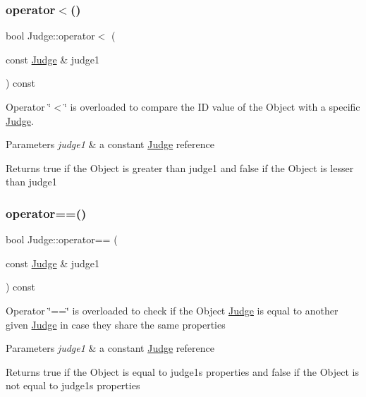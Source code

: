 \subsubsection{\texorpdfstring{operator$<$()}{operator<()}}
{\footnotesize\ttfamily bool Judge\+::operator$<$ (\begin{DoxyParamCaption}\item[{const \hyperlink{class_judge}{Judge} \&}]{judge1 }\end{DoxyParamCaption}) const}



Operator \char`\"{}$<$\char`\"{} is overloaded to compare the ID value of the Object with a specific \hyperlink{class_judge}{Judge}. 


\begin{DoxyParams}{Parameters}
{\em judge1} & a constant \hyperlink{class_judge}{Judge} reference \\
\hline
\end{DoxyParams}
\begin{DoxyReturn}{Returns}
true if the Object is greater than judge1 and false if the Object is lesser than judge1 
\end{DoxyReturn}
\mbox{\label{class_judge_ab3a06af6dc3a2f5f427c146e2b1a4573}} 
\subsubsection{\texorpdfstring{operator==()}{operator==()}}
{\footnotesize\ttfamily bool Judge\+::operator== (\begin{DoxyParamCaption}\item[{const \hyperlink{class_judge}{Judge} \&}]{judge1 }\end{DoxyParamCaption}) const}

Operator \char`\"{}==\char`\"{} is overloaded to check if the Object \hyperlink{class_judge}{Judge} is equal to another given \hyperlink{class_judge}{Judge} in case they share the same properties 
\begin{DoxyParams}{Parameters}
{\em judge1} & a constant \hyperlink{class_judge}{Judge} reference \\
\hline
\end{DoxyParams}
\begin{DoxyReturn}{Returns}
true if the Object is equal to judge1\textquotesingle{}s properties and false if the Object is not equal to judge1\textquotesingle{}s properties 
\end{DoxyReturn}
\mbox{\label{class_judge_a06f4e2a65994b0e0a2e6aad38af0edea}} 
